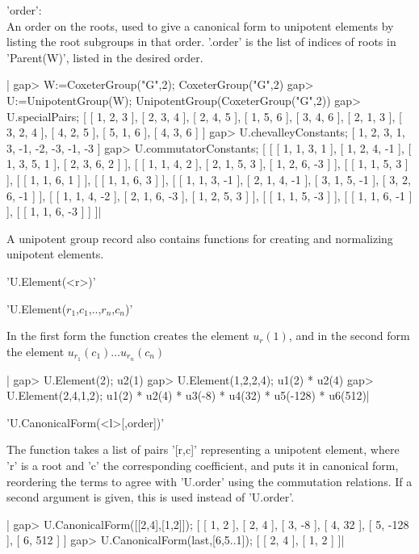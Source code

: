 'order':\\  An order on the roots, used to give a canonical form to unipotent
     elements  by listing the root subgroups in that order. '.order' is the
     list of indices of roots in 'Parent(W)', listed in the desired order.

|    gap> W:=CoxeterGroup("G",2);
    CoxeterGroup("G",2)
    gap> U:=UnipotentGroup(W);
    UnipotentGroup(CoxeterGroup("G",2))
    gap> U.specialPairs;
    [ [ 1, 2, 3 ], [ 2, 3, 4 ], [ 2, 4, 5 ], [ 1, 5, 6 ], [ 3, 4, 6 ],
      [ 2, 1, 3 ], [ 3, 2, 4 ], [ 4, 2, 5 ], [ 5, 1, 6 ], [ 4, 3, 6 ] ]
    gap> U.chevalleyConstants;
    [ 1, 2, 3, 1, 3, -1, -2, -3, -1, -3 ]
    gap> U.commutatorConstants;
    [ [ [ 1, 1, 3, 1 ], [ 1, 2, 4, -1 ], [ 1, 3, 5, 1 ], [ 2, 3, 6, 2 ] ],
      [ [ 1, 1, 4, 2 ], [ 2, 1, 5, 3 ], [ 1, 2, 6, -3 ] ],
      [ [ 1, 1, 5, 3 ] ], [ [ 1, 1, 6, 1 ] ], [ [ 1, 1, 6, 3 ] ],
      [ [ 1, 1, 3, -1 ], [ 2, 1, 4, -1 ], [ 3, 1, 5, -1 ],
          [ 3, 2, 6, -1 ] ],
      [ [ 1, 1, 4, -2 ], [ 2, 1, 6, -3 ], [ 1, 2, 5, 3 ] ],
      [ [ 1, 1, 5, -3 ] ], [ [ 1, 1, 6, -1 ] ], [ [ 1, 1, 6, -3 ] ] ]|

A unipotent group record also contains functions for creating and normalizing
unipotent elements.

'U.Element(<r>)'

'U.Element($r_1$,$c_1$,..,$r_n$,$c_n$)'

In the first form the function creates the element $u_r(1)$, and in the second
form the element $u_{r_1}(c_1)\ldots u_{r_n}(c_n)$

|    gap> U.Element(2);
    u2(1)
    gap> U.Element(1,2,2,4);
    u1(2) * u2(4)
    gap> U.Element(2,4,1,2);
    u1(2) * u2(4) * u3(-8) * u4(32) * u5(-128) * u6(512)|

'U.CanonicalForm(<l>[,order])'

The  function  takes  a  list  of  pairs  '[r,c]'  representing a unipotent
element,  where 'r'  is a  root and  'c' the corresponding coefficient, and
puts  it in  canonical form,  reordering the  terms to  agree with 'U.order'
using  the commutation  relations. If  a second  argument is given, this is
used instead of 'U.order'.

|    gap> U.CanonicalForm([[2,4],[1,2]]);
    [ [ 1, 2 ], [ 2, 4 ], [ 3, -8 ], [ 4, 32 ], [ 5, -128 ], [ 6, 512 ] ]
    gap> U.CanonicalForm(last,[6,5..1]);
    [ [ 2, 4 ], [ 1, 2 ] ]|


